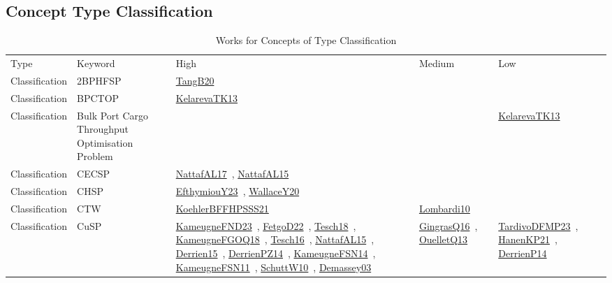\clearpage
\subsection{Concept Type Classification}
\label{sec:Classification}
{\scriptsize
\begin{longtable}{lp{3cm}>{\raggedright\arraybackslash}p{6cm}>{\raggedright\arraybackslash}p{6cm}>{\raggedright\arraybackslash}p{8cm}}
\rowcolor{white}\caption{Works for Concepts of Type Classification}\\ \toprule
\rowcolor{white}Type & Keyword & High & Medium & Low\\ \midrule\endhead
\bottomrule
\endfoot
Classification & 2BPHFSP & \href{works/TangB20.pdf}{TangB20}~\cite{TangB20} &  & \\
Classification & BPCTOP & \href{works/KelarevaTK13.pdf}{KelarevaTK13}~\cite{KelarevaTK13} &  & \\
Classification & Bulk Port Cargo Throughput Optimisation Problem &  &  & \href{works/KelarevaTK13.pdf}{KelarevaTK13}~\cite{KelarevaTK13}\\
Classification & CECSP & \href{works/NattafAL17.pdf}{NattafAL17}~\cite{NattafAL17}, \href{works/NattafAL15.pdf}{NattafAL15}~\cite{NattafAL15} &  & \\
Classification & CHSP & \href{works/EfthymiouY23.pdf}{EfthymiouY23}~\cite{EfthymiouY23}, \href{works/WallaceY20.pdf}{WallaceY20}~\cite{WallaceY20} &  & \\
Classification & CTW & \href{works/KoehlerBFFHPSSS21.pdf}{KoehlerBFFHPSSS21}~\cite{KoehlerBFFHPSSS21} & \href{works/Lombardi10.pdf}{Lombardi10}~\cite{Lombardi10} & \\
Classification & CuSP & \href{works/KameugneFND23.pdf}{KameugneFND23}~\cite{KameugneFND23}, \href{works/FetgoD22.pdf}{FetgoD22}~\cite{FetgoD22}, \href{works/Tesch18.pdf}{Tesch18}~\cite{Tesch18}, \href{works/KameugneFGOQ18.pdf}{KameugneFGOQ18}~\cite{KameugneFGOQ18}, \href{works/Tesch16.pdf}{Tesch16}~\cite{Tesch16}, \href{works/NattafAL15.pdf}{NattafAL15}~\cite{NattafAL15}, \href{works/Derrien15.pdf}{Derrien15}~\cite{Derrien15}, \href{works/DerrienPZ14.pdf}{DerrienPZ14}~\cite{DerrienPZ14}, \href{works/KameugneFSN14.pdf}{KameugneFSN14}~\cite{KameugneFSN14}, \href{works/KameugneFSN11.pdf}{KameugneFSN11}~\cite{KameugneFSN11}, \href{works/SchuttW10.pdf}{SchuttW10}~\cite{SchuttW10}, \href{works/Demassey03.pdf}{Demassey03}~\cite{Demassey03} & \href{works/GingrasQ16.pdf}{GingrasQ16}~\cite{GingrasQ16}, \href{works/OuelletQ13.pdf}{OuelletQ13}~\cite{OuelletQ13} & \href{works/TardivoDFMP23.pdf}{TardivoDFMP23}~\cite{TardivoDFMP23}, \href{works/HanenKP21.pdf}{HanenKP21}~\cite{HanenKP21}, \href{works/DerrienP14.pdf}{DerrienP14}~\cite{DerrienP14}\\

\end{longtable}}
